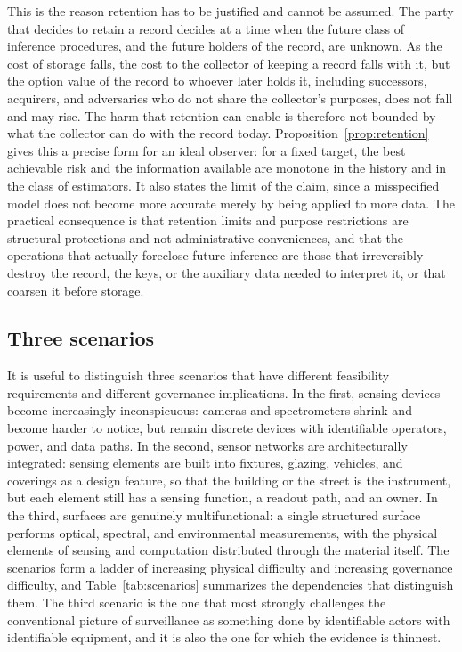 \documentclass[11pt]{article}
\theoremstyle{plain}
\theoremstyle{definition}
\theoremstyle{remark}
\begin{document}
This is the reason retention has to be justified and cannot be assumed. The party that decides to retain a record decides at a time when the future class of inference procedures, and the future holders of the record, are unknown. As the cost of storage falls, the cost to the collector of keeping a record falls with it, but the option value of the record to whoever later holds it, including successors, acquirers, and adversaries who do not share the collector's purposes, does not fall and may rise. The harm that retention can enable is therefore not bounded by what the collector can do with the record today. Proposition~\ref{prop:retention} gives this a precise form for an ideal observer: for a fixed target, the best achievable risk and the information available are monotone in the history and in the class of estimators. It also states the limit of the claim, since a misspecified model does not become more accurate merely by being applied to more data. The practical consequence is that retention limits and purpose restrictions are structural protections and not administrative conveniences, and that the operations that actually foreclose future inference are those that irreversibly destroy the record, the keys, or the auxiliary data needed to interpret it, or that coarsen it before storage.

\subsection{Three scenarios}

It is useful to distinguish three scenarios that have different feasibility requirements and different governance implications. In the first, sensing devices become increasingly inconspicuous: cameras and spectrometers shrink and become harder to notice, but remain discrete devices with identifiable operators, power, and data paths. In the second, sensor networks are architecturally integrated: sensing elements are built into fixtures, glazing, vehicles, and coverings as a design feature, so that the building or the street is the instrument, but each element still has a sensing function, a readout path, and an owner. In the third, surfaces are genuinely multifunctional: a single structured surface performs optical, spectral, and environmental measurements, with the physical elements of sensing and computation distributed through the material itself. The scenarios form a ladder of increasing physical difficulty and increasing governance difficulty, and Table~\ref{tab:scenarios} summarizes the dependencies that distinguish them. The third scenario is the one that most strongly challenges the conventional picture of surveillance as something done by identifiable actors with identifiable equipment, and it is also the one for which the evidence is thinnest.
\end{document}
